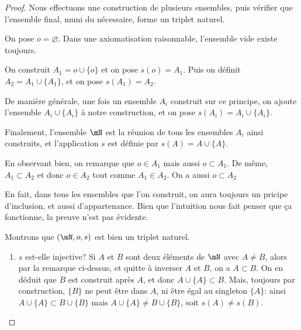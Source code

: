 \begin{proof}
	Nous effectuons une construction de plusieurs ensembles, puis vérifier que l'ensemble final, muni du nécessaire, forme un triplet naturel.

	\begin{subproof}
		On pose \( o = \varnothing \). Dans une axiomatisation raisonnable, l'ensemble vide existe toujours.

		On construit \( A_1 = o \cup \{ o \} \) et on pose \( s(o) = A_1 \).
		Puis on définit \( A_2 = A_1 \cup \{ A_1 \} \), et on pose \( s(A_1) = A_2 \).

		De manière générale, une fois un ensemble \( A_i \) construit sur ce principe, on ajoute l'ensemble \( A_i \cup \{ A_i \} \) à notre construction, et on pose \( s(A_i) = A_i \cup \{ A_i \} \).

		Finalement, l'ensemble \( \mN \) est la réunion de tous les ensembles \( A_i \) ainsi construits, et l'application \( s \) est définie par  \( s(A) = A \cup \{ A \} \).

		En observant bien, on remarque que \( o \in A_1 \) mais aussi \( o \subset A_1 \). De même, \( A_1 \subset A_2 \) et donc \( o \in A_2 \) tout comme \( A_1 \in A_2 \). On a aussi \( o \subset A_2 \)

		En fait, dans tous les ensembles que l'on construit, on aura toujours un pricipe d'inclusion, et aussi d'appartenance. Bien que l'intuition nous fait penser que ça fonctionne, la preuve n'est pas évidente.

		Montrons que  \( (\mN, o, s)\) est bien un triplet naturel.
		\begin{enumerate}
			\item \( s \) est-elle injective? Si \( A \) et \( B \) sont deux éléments de \( \mN \) avec \( A \neq B \), alors par la remarque ci-dessus, et quitte à inverser \( A \) et \( B \), on a \( A \subset B \). On en déduit que \( B \) est construit après \( A \), et donc \( A \cup \{ A \} \subset B \). Mais, toujours par construction, \( \{ B \} \)  ne peut être dans \( A \), ni être égal au singleton \( \{ A \} \): ainsi \( A \cup \{ A \} \subset B \cup \{ B \} \) mais \( A \cup \{ A \} \neq B \cup \{ B \} \), soit \( s(A) \neq s(B) \).


\end{enumerate}
\end{subproof}
\end{proof}
